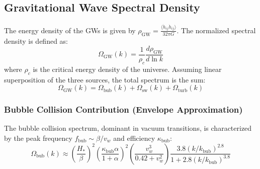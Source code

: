 \documentclass{article}
\begin{document}
\subsection{Gravitational Wave Spectral Density}

The energy density of the GWs is given by $\rho_{\text{GW}} = \frac{\langle \dot{h}_{ij} \dot{h}_{ij} \rangle}{32\pi G}$. The normalized spectral density is defined as:
\begin{equation}
    \Omega_{\text{GW}}(k) = \frac{1}{\rho_c} \frac{d \rho_{\text{GW}}}{d \ln k}
\end{equation}
where $\rho_c$ is the critical energy density of the universe. Assuming linear superposition of the three sources, the total spectrum is the sum:
\begin{equation}
    \Omega_{\text{GW}}(k) = \Omega_{\text{bub}}(k) + \Omega_{\text{sw}}(k) + \Omega_{\text{turb}}(k)
\end{equation}

\subsubsection{Bubble Collision Contribution (Envelope Approximation)}
The bubble collision spectrum, dominant in vacuum transitions, is characterized by the peak frequency $f_{\text{bub}} \sim \beta/v_w$ and efficiency $\kappa_{\text{bub}}$:
\begin{equation}
    \Omega_{\text{bub}}(k) \approx \left( \frac{H_*}{\beta} \right)^2 \left( \frac{\kappa_{\text{bub}} \alpha}{1 + \alpha} \right)^2 \left( \frac{v_w^3}{0.42 + v_w^2} \right) \frac{3.8 (k/k_{\text{bub}})^{2.8}}{1 + 2.8 (k/k_{\text{bub}})^{3.8}}
\end{equation}
\end{document}
